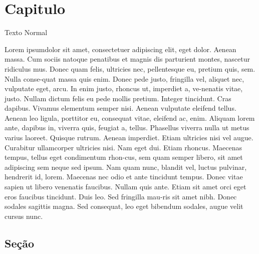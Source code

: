 \documentclass{ufsc-thesis}
\begin{document}
\data{\today}

\makeatletter
{}
\makeatother
\pretextual
\imprimircapa
\textual

\chapter{Capitulo}

Texto Normal

\showfont

Lorem ipsumdolor sit amet, consectetuer adipiscing elit, eget
dolor. Aenean massa. Cum sociis natoque penatibus et magnis
dis parturient montes, nascetur ridiculus mus. Donec quam felis,
ultricies nec, pellentesque eu, pretium quis, sem.
Nulla conse-quat massa quis enim. Donec pede justo, fringilla vel, aliquet nec,
vulputate eget, arcu. In enim justo, rhoncus ut, imperdiet a, ve-nenatis vitae,
justo. Nullam dictum felis eu pede mollis pretium.
Integer tincidunt. Cras dapibus. Vivamus elementum semper nisi.
Aenean vulputate eleifend tellus. Aenean leo ligula, porttitor eu,
consequat vitae, eleifend ac, enim. Aliquam lorem ante, dapibus
in, viverra quis, feugiat a, tellus. Phasellus viverra nulla ut metus
varius laoreet. Quisque rutrum. Aenean imperdiet. Etiam ultricies
nisi vel augue. Curabitur ullamcorper ultricies nisi. Nam eget dui.
Etiam rhoncus. Maecenas tempus, tellus eget condimentum rhon-cus, sem quam
semper libero, sit amet adipiscing sem neque sed ipsum. Nam quam nunc, blandit
vel, luctus pulvinar, hendrerit id, lorem. Maecenas nec odio et ante tincidunt
tempus. Donec vitae sapien ut libero venenatis faucibus. Nullam quis ante. Etiam
sit amet orci eget eros faucibus tincidunt. Duis leo. Sed fringilla mau-ris sit
amet nibh. Donec sodales sagittis magna. Sed consequat, leo eget bibendum
sodales, augue velit cursus nunc.

\section{Seção}
\end{document}
